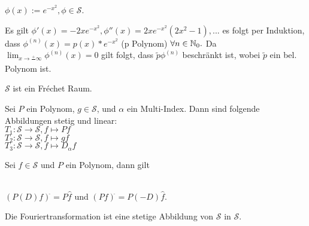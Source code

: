 \documentclass{article}
\begin{document}
\begin{beispiel}
$ \phi(x) := e^{-x^2}, \phi \in \mathcal{S}$.
\end{beispiel}

\begin{beweis}
Es gilt $\phi'(x)= -2xe^{-x^2}, \phi''(x)= 2xe^{-x^2}(2x^2-1), ...$ 
es folgt per Induktion, dass $ \phi^{(n)}(x)=p(x)*e^{-x^2}$ (p Polynom) $\forall n \in \mathbb{N}_0.$ 
Da $\lim_{x \to \frac{+}{}\infty} \phi^{(n)}(x) = 0$ gilt folgt, dass $\widetilde{p}\phi^{(n)}$ beschränkt ist, wobei
$\widetilde{p}$ ein bel. Polynom ist.
\end{beweis}


\begin{satz}
\begin{liste} 
\item $\mathcal{S}$ ist ein Fréchet Raum.
\item Sei $P$ ein Polynom, $g \in \mathcal{S}$, und $\alpha$ ein Multi-Index. Dann sind folgende Abbildungen stetig und linear: \\
$T_1: \mathcal{S} \to \mathcal{S}, f \mapsto Pf$ \\
$T_2: \mathcal{S} \to \mathcal{S}, f \mapsto gf$ \\
$T_3: \mathcal{S} \to \mathcal{S}, f \mapsto D_\alpha f$

\item Sei $f \in \mathcal{S}$ und  $P$ ein Polynom, dann gilt \\ \\
\centerline{$(P(D)f)^{\widehat{ }} = P \widehat{f}$ und $(Pf)^{\widehat{ }} = P(-D) \widehat{f}$.}
\item Die Fouriertransformation ist eine stetige Abbildung von $\mathcal{S}$ in $\mathcal{S}$.
\end{liste}
\end{satz}
\end{document}
